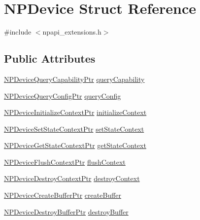 \hypertarget{struct_n_p_device}{
\section{NPDevice Struct Reference}
\label{struct_n_p_device}
}


{\ttfamily \#include $<$npapi\_\-extensions.h$>$}

\subsection*{Public Attributes}
\begin{DoxyCompactItemize}
\item 
\hyperlink{npapi__extensions_8h_a048052d99502d616b23a7d4744600618}{NPDeviceQueryCapabilityPtr} \hyperlink{struct_n_p_device_ae8f9e9b905ed833cbd2fd0c23d9a9b2b}{queryCapability}
\item 
\hyperlink{npapi__extensions_8h_acd6318131a9d90e0ddfbae5b341f18a7}{NPDeviceQueryConfigPtr} \hyperlink{struct_n_p_device_af7a4897fbaa468bafc56ec99883dd0e8}{queryConfig}
\item 
\hyperlink{npapi__extensions_8h_ab43b75c14de2dbcd6fff653c6c2b718f}{NPDeviceInitializeContextPtr} \hyperlink{struct_n_p_device_ab2a7fb558580435d75ba659245c2933b}{initializeContext}
\item 
\hyperlink{npapi__extensions_8h_a7454cddd29af1e03fee6956298f3a0fb}{NPDeviceSetStateContextPtr} \hyperlink{struct_n_p_device_aac2938686b27ae8226241777ac3a08e4}{setStateContext}
\item 
\hyperlink{npapi__extensions_8h_aa45815351f353c0424a2b69733206a71}{NPDeviceGetStateContextPtr} \hyperlink{struct_n_p_device_a87e416564b0860d3a51f494ee392466e}{getStateContext}
\item 
\hyperlink{npapi__extensions_8h_aedbb7b875a59c38191ae3e448dccf885}{NPDeviceFlushContextPtr} \hyperlink{struct_n_p_device_a2640def6763551de0f6311f8a45ea5f2}{flushContext}
\item 
\hyperlink{npapi__extensions_8h_ae5a0f8b1ce7f30a7c919aa180e6e8f61}{NPDeviceDestroyContextPtr} \hyperlink{struct_n_p_device_a041234ca1d9cabfd58473ad825765175}{destroyContext}
\item 
\hyperlink{npapi__extensions_8h_a7c82e5512e772db685c46d1597157ab4}{NPDeviceCreateBufferPtr} \hyperlink{struct_n_p_device_a115b39b51998f67d7a44cb9e2ae654ff}{createBuffer}
\item 
\hyperlink{npapi__extensions_8h_a60dc39f005eec39bf1efd43149fde911}{NPDeviceDestroyBufferPtr} \hyperlink{struct_n_p_device_a86b73ff8acb883d14656b00bc6c0ce85}{destroyBuffer}

\end{DoxyCompactItemize}
